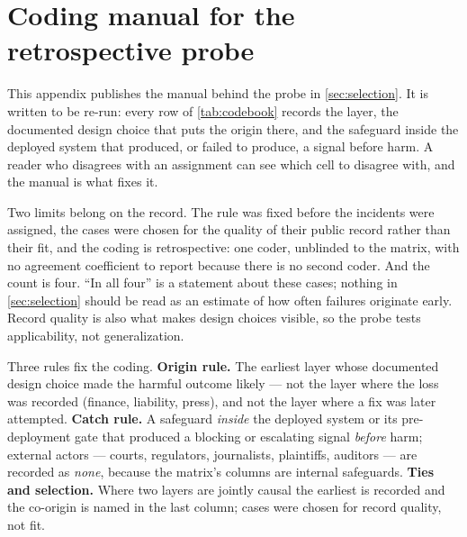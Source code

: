 \section{Coding manual for the retrospective probe}
\label{app:codebook}

This appendix publishes the manual behind the probe in \cref{sec:selection}. It is written to be
re-run: every row of \cref{tab:codebook} records the layer, the documented design choice that puts
the origin there, and the safeguard inside the deployed system that produced, or failed to
produce, a signal before harm. A reader who disagrees with an assignment can see which cell to
disagree with, and the manual is what fixes it.

Two limits belong on the record. The rule was fixed before the incidents were assigned, the cases
were chosen for the quality of their public record rather than their fit, and the coding is
retrospective: one coder, unblinded to the matrix, with no agreement coefficient to report
because there is no second coder. And the count is four. ``In all four'' is a statement about
these cases; nothing in \cref{sec:selection} should be read as an estimate of how often
failures originate early. Record quality is also what makes design choices visible, so the probe
tests applicability, not generalization.

Three rules fix the coding. \textbf{Origin rule.} The earliest layer whose documented design choice
made the harmful outcome likely --- not the layer where the loss was recorded (finance, liability,
press), and not the layer where a fix was later attempted. \textbf{Catch rule.} A safeguard
\emph{inside} the deployed system or its pre-deployment gate that produced a blocking or escalating
signal \emph{before} harm; external actors --- courts, regulators, journalists, plaintiffs,
auditors --- are recorded as \emph{none}, because the matrix's columns are internal safeguards.
\textbf{Ties and selection.} Where two layers are jointly causal the earliest is recorded and the
co-origin is named in the last column; cases were chosen for record quality, not fit.

